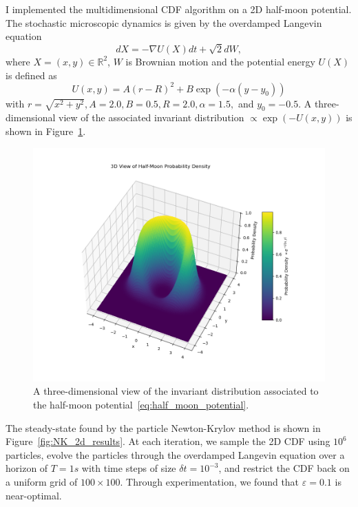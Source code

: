 \documentclass{article}
\begin{document}
I implemented the multidimensional CDF algorithm on a 2D half-moon potential. The stochastic microscopic dynamics is given by the overdamped Langevin equation
\begin{equation}
    dX = -\nabla U(X) dt + \sqrt{2} dW,
\end{equation}
where $X = (x, y) \in \mathbb{R}^2$, $W$ is Brownian motion and the potential energy $U(X)$ is defined as
\begin{equation} \label{eq:half_moon_potential}
    U(x, y) = A (r - R)^2 + B \exp\left(-\alpha (y - y_0)\right)
\end{equation}
with $r = \sqrt{x^2 + y^2}, A = 2.0, B = 0.5, R = 2.0, \alpha=1.5,$ and $y_0 = -0.5$. A three-dimensional view of the associated invariant distribution $\propto \exp\left(-U(x, y)\right)$ is shown in Figure~\ref{fig:halfmoonpotential}.
\begin{figure}
    \centering
    \includegraphics[trim={0.5cm 2cm 0.5cm 2cm},width=0.9\linewidth]{figures/half_moon_potential.png}
    \caption{A three-dimensional view of the invariant distribution associated to the half-moon potential~\eqref{eq:half_moon_potential}.}
    \label{fig:halfmoonpotential}
\end{figure}
The steady-state found by the particle Newton-Krylov method is shown in Figure~\ref{fig:NK_2d_results}. At each iteration, we sample the 2D CDF using $10^6$ particles, evolve the particles through the overdamped Langevin equation over a horizon of $T = 1s$ with time steps of size $\delta t = 10^{-3}$, and restrict the CDF back on a uniform grid of $100 \times 100$. Through experimentation, we found that $\varepsilon = 0.1$ is near-optimal.
\end{document}
